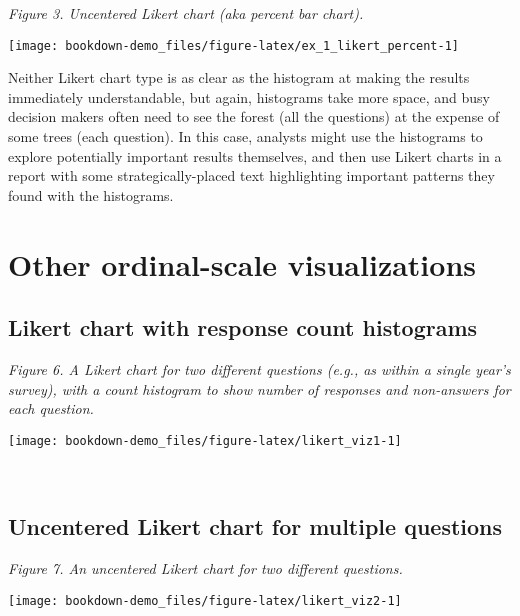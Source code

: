 \documentclass[]{book}
\begin{document}
\emph{Figure 3. Uncentered Likert chart (aka percent bar chart).}

\begin{center}\texttt{[image: bookdown-demo\_files/figure-latex/ex\_1\_likert\_percent-1]} \end{center}

Neither Likert chart type is as clear as the histogram at making the
results immediately understandable, but again, histograms take more
space, and busy decision makers often need to see the forest (all the
questions) at the expense of some trees (each question). In this case,
analysts might use the histograms to explore potentially important
results themselves, and then use Likert charts in a report with some
strategically-placed text highlighting important patterns they found
with the histograms.

\section{Other ordinal-scale
visualizations}\label{other-ordinal-scale-visualizations}

\subsection{Likert chart with response count
histograms}\label{likert-chart-with-response-count-histograms}

\emph{Figure 6. A Likert chart for two different questions (e.g., as
within a single year's survey), with a count histogram to show number of
responses and non-answers for each question.}

\begin{center}\texttt{[image: bookdown-demo\_files/figure-latex/likert\_viz1-1]} \end{center}

~

\subsection{Uncentered Likert chart for multiple
questions}\label{uncentered-likert-chart-for-multiple-questions}

\emph{Figure 7. An uncentered Likert chart for two different questions.}

\begin{center}\texttt{[image: bookdown-demo\_files/figure-latex/likert\_viz2-1]} \end{center}

~
\end{document}
